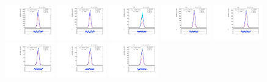 \begin{figure}[htb]
\includegraphics[width=0.19\textwidth]{plots/Appendix_Recoil_Fits/ZmmMC_PF_5TeV_2G/pfu1fit_8.pdf}
\includegraphics[width=0.19\textwidth]{plots/Appendix_Recoil_Fits/ZmmMC_PF_5TeV_2G/pfu1fit_9.pdf}
\includegraphics[width=0.19\textwidth]{plots/Appendix_Recoil_Fits/ZmmMC_PF_5TeV_2G/pfu1fit_19.pdf}
\includegraphics[width=0.19\textwidth]{plots/Appendix_Recoil_Fits/ZmmMC_PF_5TeV_2G/pfu1fit_11.pdf}
\includegraphics[width=0.19\textwidth]{plots/Appendix_Recoil_Fits/ZmmMC_PF_5TeV_2G/pfu1fit_12.pdf}
\includegraphics[width=0.19\textwidth]{plots/Appendix_Recoil_Fits/ZmmMC_PF_5TeV_2G/pfu1fit_13.pdf}
\includegraphics[width=0.19\textwidth]{plots/Appendix_Recoil_Fits/ZmmMC_PF_5TeV_2G/pfu1fit_14.pdf}
\includegraphics[width=0.19\textwidth]{plots/Appendix_Recoil_Fits/ZmmMC_PF_5TeV_2G/pfu1fit_15.pdf}

\end{figure}

